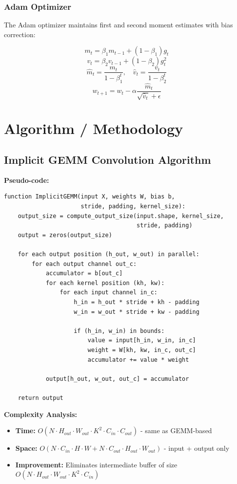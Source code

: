 \documentclass[12pt,oneside,a4paper]{report}
\begin{document}
\subsubsection{Adam Optimizer}

The Adam optimizer maintains first and second moment estimates with bias correction:

$$m_t = \beta_1 m_{t-1} + (1-\beta_1) g_t$$
$$v_t = \beta_2 v_{t-1} + (1-\beta_2) g_t^2$$
$$\hat{m}_t = \frac{m_t}{1-\beta_1^t}, \quad \hat{v}_t = \frac{v_t}{1-\beta_2^t}$$
$$w_{t+1} = w_t - \alpha \frac{\hat{m}_t}{\sqrt{\hat{v}_t} + \epsilon}$$

\section{Algorithm / Methodology}

\subsection{Implicit GEMM Convolution Algorithm}

\textbf{Pseudo-code:}

\begin{lstlisting}
function ImplicitGEMM(input X, weights W, bias b,
                      stride, padding, kernel_size):
    output_size = compute_output_size(input.shape, kernel_size,
                                      stride, padding)
    output = zeros(output_size)

    for each output position (h_out, w_out) in parallel:
        for each output channel out_c:
            accumulator = b[out_c]
            for each kernel position (kh, kw):
                for each input channel in_c:
                    h_in = h_out * stride + kh - padding
                    w_in = w_out * stride + kw - padding

                    if (h_in, w_in) in bounds:
                        value = input[h_in, w_in, in_c]
                        weight = W[kh, kw, in_c, out_c]
                        accumulator += value * weight

            output[h_out, w_out, out_c] = accumulator

    return output
\end{lstlisting}

\textbf{Complexity Analysis:}
\begin{itemize}
    \item \textbf{Time:} $O(N \cdot H_{out} \cdot W_{out} \cdot K^2 \cdot C_{in} \cdot C_{out})$ - same as GEMM-based
    \item \textbf{Space:} $O(N \cdot C_{in} \cdot H \cdot W + N \cdot C_{out} \cdot H_{out} \cdot W_{out})$ - input + output only
    \item \textbf{Improvement:} Eliminates intermediate buffer of size $O(N \cdot H_{out} \cdot W_{out} \cdot K^2 \cdot C_{in})$
\end{itemize}
\end{document}
